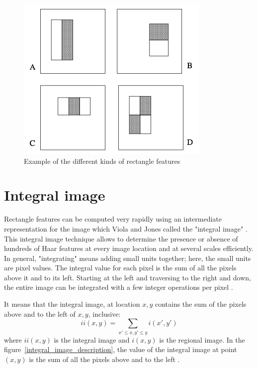 \begin{figure}[!h]
\begin{center}
\noindent \includegraphics[scale=0.6]{figures/haar_feature_description} 
\newline
\caption{Example of the different kinds of rectangle features}
\label{haar_feature_description}
\end{center} 
\end{figure}

\section{Integral image}

\noindent Rectangle features can be computed very rapidly using an intermediate representation for the image which Viola and Jones called the "integral image" \cite{VIO01}. This integral image technique allows to determine the presence or absence of hundreds of Haar features at every image location and at several scales efficiently. In general, "integrating" means adding small units together; here, the small units are pixel values. The integral value for each pixel is the sum of all the pixels above it and to its left. Starting at the left and traversing to the right and down, the entire image can be integrated with a few integer operations per pixel \cite{HEW07}.
\newline

\noindent It means that the integral image, at location $ x,y $ contains the sum of the pixels above and to the left of $ x,y $, inclusive: \[ ii(x,y) = \sum_{x' \leq x,y' \leq y} i(x',y') \] where $ ii(x,y) $ is the integral image and $ i(x,y) $ is the regional image. In the figure~\ref{integral_image_description}, the value of the integral image at point $ (x,y) $ is the sum of all the pixels above and to the left \cite{VIO01}. 
\newline
	
